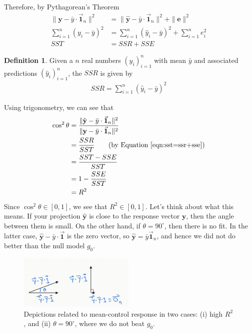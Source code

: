 \documentclass[12pt, a4paper]{article}
\theoremstyle{definition}
\newtheorem*{definition}{Definition}
\begin{document}
	Therefore, by Pythagorean's Theorem
	\begin{align}
		\|\mathbf{y} - \bar{y}\cdot \vec{\mathbf{1}}_n\|^2
		&= \|\hat{\mathbf{y}}-\bar{y}\cdot \vec{\mathbf{1}}_n\|^2
		+ \|\mathbf{e}\|^2\nonumber\\
		\sum_{i=1}^{n}(y_i-\bar{y})^2 &= \sum_{i=1}^{n}(\hat{y}_i-\bar{y})^2
		+\sum_{i=1}^{n}e_i^2\nonumber\\
		SST &= SSR + SSE\label{eqn:sst=ssr+sse}
	\end{align}
	\begin{tcolorbox}
		\begin{definition}
			Given a $n$ real numbers $(y_i)_{i=1}^{n}$ with mean $\bar{y}$ and associated
			predictions $(\hat{y}_i)_{i=1}^{n}$, the $SSR$ is given by
			\begin{align*}
				SSR = \sum_{i=1}^{n}(\hat{y}_i-\bar{y})^2
			\end{align*}
		\end{definition}
	\end{tcolorbox}
	Using trigonometry, we can see that
	\begin{align*}
		\cos^2\theta &=
		\frac{\|\hat{\mathbf{y}} - \bar{y}\cdot \vec{\mathbf{1}}_n\|^2}{\|\mathbf{y} - \bar{y}\cdot \vec{\mathbf{1}}_n\|^2}\\
		&=\frac{SSR}{SST}
		\tag{by Equation~\ref{eqn:sst=ssr+sse}}\\
		&=\frac{SST-SSE}{SST}\\
		&=1-\frac{SSE}{SST}\\
		&=R^2
	\end{align*}
	Since $\cos^2\theta\in [0, 1]$, we see that $R^2\in [0, 1]$.
	Let's think about what this means. If your projection $\hat{\mathbf{y}}$ is close
	to the response vector $\mathbf{y}$, then the angle between them is small. On the
	other hand, if $\theta=90^\circ$, then there is no fit. In the latter case,
	$\hat{\mathbf{y}}-\bar{y}\cdot \vec{\mathbf{1}}$ is the zero vector, so
	$\hat{\mathbf{y}}=\bar{y}\vec{\mathbf{1}}_n$, and hence we did not do better than the null
	model $g_0$.
	\begin{figure}
		\centering
		\includegraphics[width=0.5\textwidth]{mean-control-response-angle}
		\caption{Depictions related to mean-control response in two cases: (i) high $R^2$, and 
			(ii) $\theta=90^\circ$, where we do not beat $g_0$.}
		\label{fig:control-response-angle}
	\end{figure}
\end{document}

